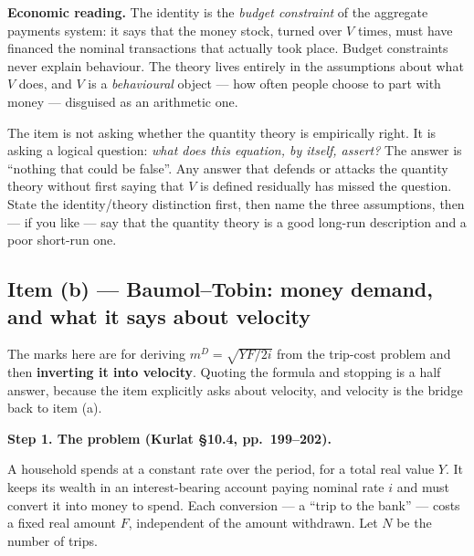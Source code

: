 \documentclass[11pt, a4paper]{article}
\newcommand{\passo}[1]{\medskip\noindent\textbf{#1}\par\nobreak}
\newcommand{\intuicao}[1]{%
  \medskip\noindent\textcolor{midblue}{\textbf{Economic reading.}} #1\par}
\newcommand{\md}{m^{D}}
\begin{document}
\intuicao{The identity is the \emph{budget constraint} of the aggregate payments system: it
says that the money stock, turned over $V$ times, must have financed the nominal transactions
that actually took place. Budget constraints never explain behaviour. The theory lives
entirely in the assumptions about what $V$ does, and $V$ is a \emph{behavioural} object ---
how often people choose to part with money --- disguised as an arithmetic one.}

\begin{tcolorbox}[trapbox, title={The trap: answering ``because money causes inflation''}]
\small
The item is not asking whether the quantity theory is empirically right. It is asking a
logical question: \emph{what does this equation, by itself, assert?} The answer is ``nothing
that could be false''. Any answer that defends or attacks the quantity theory without first
saying that $V$ is defined residually has missed the question. State the identity/theory
distinction first, then name the three assumptions, then --- if you like --- say that the
quantity theory is a good long-run description and a poor short-run one.
\end{tcolorbox}

\subsection*{Item (b) --- Baumol--Tobin: money demand, and what it says about velocity}

\begin{tcolorbox}[planbox, title={Build the square root; do not quote it}]
\small
The marks here are for deriving $\md=\sqrt{YF/2i}$ from the trip-cost problem and then
\textbf{inverting it into velocity}. Quoting the formula and stopping is a half answer,
because the item explicitly asks about velocity, and velocity is the bridge back to item (a).
\end{tcolorbox}

\passo{Step 1. The problem (Kurlat \S10.4, pp.\ 199--202).}
A household spends at a constant rate over the period, for a total real value $Y$. It keeps
its wealth in an interest-bearing account paying nominal rate $i$ and must convert it into
money to spend. Each conversion --- a ``trip to the bank'' --- costs a fixed real amount $F$,
independent of the amount withdrawn. Let $N$ be the number of trips.
\end{document}
